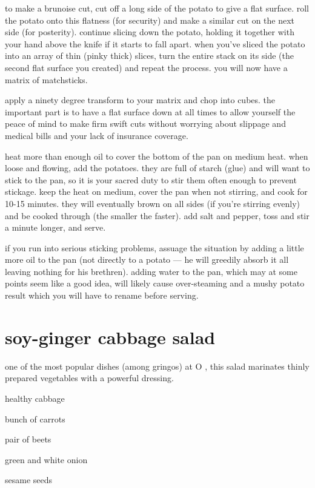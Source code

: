 to make a brunoise cut, cut off a long side of the potato to give a flat 
surface. roll the potato onto this flatness (for security) and make a similar 
cut on the next side (for posterity). continue slicing down the potato, 
holding it together with your hand above the knife if it starts to fall apart. 
when you've sliced the potato into an array of thin (pinky thick) slices, turn 
the entire stack on its side (the second flat surface you created) and repeat 
the process. you will now have a matrix of matchsticks.

apply a ninety degree transform to your matrix and chop into cubes. the 
important part is to have a flat surface down at all times to allow yourself 
the peace of mind to make firm swift cuts without worrying about slippage and 
medical bills and your lack of insurance coverage.

heat more than enough oil to cover the bottom of the pan on medium heat. when 
loose and flowing, add the potatoes. they are full of starch (glue) and will 
want to stick to the pan, so it is your sacred duty to stir them often enough 
to prevent stickage. keep the heat on medium, cover the pan when not stirring, 
and cook for 10-15 minutes. they will eventually brown on all sides (if you're 
stirring evenly) and be cooked through (the smaller the faster). add salt and 
pepper, toss and stir a minute longer, and serve.

if you run into serious sticking problems, assuage the situation by adding a 
little more oil to the pan (not directly to a potato --- he will greedily 
absorb it all leaving nothing for his brethren). adding water to the pan, 
which may at some points seem like a good idea, will likely cause 
over-steaming and a mushy potato result which you will have to rename before 
serving.

\section{soy-ginger cabbage salad}

one of the most popular dishes (among gringos) at O , this salad 
marinates thinly prepared vegetables with a powerful dressing.

\begin{ingredients}
  \item healthy cabbage
  \item bunch of carrots
  \item pair of beets
  \item green and white onion
  \item sesame seeds
\end{ingredients}


